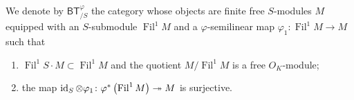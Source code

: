 \begin{defn}[]
	We denote by $\mathsf{BT}^{\varphi}_{/S}$ the category
	whose objects are finite free $S$-modules $M$
	equipped with an $S$-submodule $\operatorname{Fil}^1 M$
	and a $\varphi$-semilinear map $\varphi_1\colon  \operatorname{Fil}^1 M \to M$
	such that
\begin{enumerate}
	\item $\operatorname{Fil}^1 S \cdot M \subset \operatorname{Fil}^1 M$
		and the quotient $M/\operatorname{Fil}^1 M$ is a free $O_{ K }$-module;
	\item the map $\operatorname{id}_{ S } \otimes \varphi_1\colon 
		\varphi^* \left( \operatorname{Fil}^1 M \right) \twoheadrightarrow M$
		is surjective.
\end{enumerate}
\end{defn}


